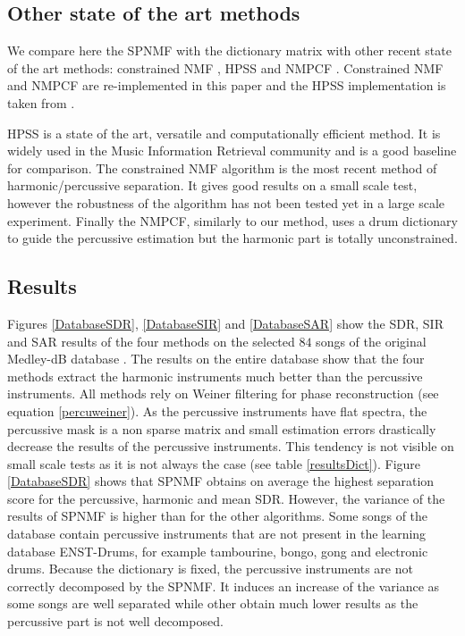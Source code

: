\documentclass[journal]{IEEEtran}
\begin{document}
\subsection{Other state of the art methods}\label{soth}

We compare here the SPNMF with the dictionary matrix with other recent state of the art methods: constrained NMF \cite{canadas2014percussive}, HPSS \cite{fitzgerald2010harmonic} and NMPCF \cite{kim2011nonnegative}. Constrained NMF and NMPCF are re-implemented in this paper and the HPSS implementation is taken from \cite{DriedgerMueller14_TSMToolbox_DAFX}.

HPSS is a state of the art, versatile and computationally efficient method. It is widely used in the Music Information Retrieval community and is a good baseline for comparison. The constrained NMF algorithm is the most recent method of harmonic/percussive separation. It gives good results on a small scale test, however the robustness of the algorithm has not been tested yet in a large scale experiment. Finally the NMPCF, similarly to our method, uses a drum dictionary to guide the percussive estimation but the harmonic part is totally unconstrained. 


\subsection{Results} \label{subResults}

Figures \ref{DatabaseSDR}, \ref{DatabaseSIR} and \ref{DatabaseSAR} show the SDR, SIR and SAR results of the four methods on the selected $84$ songs of the original Medley-dB database \cite{bittner2014medleydb}. The results on the entire database show that the four methods extract the harmonic instruments much better than the percussive instruments. All methods rely on Weiner filtering for phase reconstruction (see equation \ref{percuweiner}). As the percussive instruments have flat spectra, the percussive mask is a non sparse matrix and small estimation errors drastically decrease the results of the percussive instruments. This tendency is not visible on small scale tests as it is not always the case (see table \ref{resultsDict}). 
Figure \ref{DatabaseSDR} shows that SPNMF obtains on average the highest separation score for the percussive, harmonic and mean SDR. However, the variance of the results of SPNMF is higher than for the other algorithms. Some songs of the database contain percussive instruments that are not present in the learning database ENST-Drums, for example tambourine, bongo, gong and electronic drums. Because the dictionary is fixed, the percussive instruments are not correctly decomposed by the SPNMF. It induces an increase of the variance as some songs are well separated while other obtain much lower results as the percussive part is not well decomposed.
\end{document}
